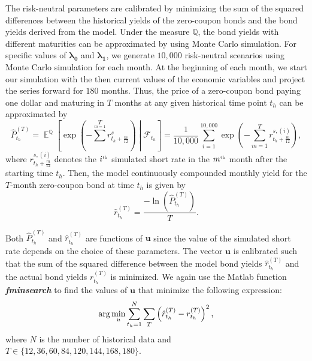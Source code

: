 \documentclass{sfuthesis}
\DeclareMathOperator{\E}{\mathbb{E}}
\numberwithin{equation}{chapter}
\begin{document}
		\justify
		The risk-neutral parameters are calibrated by minimizing the sum of the squared differences between the historical yields of the zero-coupon bonds and the bond yields derived from the model. Under the measure $\mathbb{Q}$, the bond yields with different maturities can be approximated by using Monte Carlo simulation. For specific values of $\boldsymbol{\lambda_0}$ and $\boldsymbol{\lambda_1}$, we generate $10,000$ risk-neutral scenarios using Monte Carlo simulation for each month. At the beginning of each month, we start our simulation with the then current values of the economic variables and project the series forward for $180$ months. Thus, the price of a zero-coupon bond paying one dollar and maturing in $T$ months at any given historical time point $t_h$ can be approximated by
		\begin{equation}
		\label{eq:EMR_10}
		\hat{P}^{(T)}_{t_h} = \E^\mathbb{Q} \left[\exp\left({-\sum^{T}\limits_{m = 1}r_{t_h+ \frac{m}{12}}^s }\right)\middle|\mathcal{F}_{t_{h}}\right] = \frac{1}{10,000}\sum_{i=1}^{10,000}\exp\left({-\sum\limits_{m=1}^{T}r_{t_{h}+\frac{m}{12}}^{s,(i)}}\right),
		\end{equation}
		where $r_{t_h+\frac{m}{12}}^{s, (i)}$ denotes the $i^{\text{\tiny{th}}}$ simulated short rate in the $m^{\text{\tiny{th}}}$ month after the starting time $t_h$. Then, the model continuously compounded monthly yield for the $T$-month zero-coupon bond at time $t_h$ is given by
		\begin{equation}
		\label{eq:EMR_11}
		\hat{r}^{(T)}_{t_h} = \frac{-\ln\left(\hat{P}^{(T)}_{t_h}\right)}{T}.
		\end{equation}


		\justify
		Both $\hat{P}^{(T)}_{t_h}$ and $\hat{r}^{(T)}_{t_h}$ are functions of $\boldsymbol{u}$ since the value of the simulated short rate depends on the choice of these parameters. The vector $\boldsymbol{u}$ is calibrated such that the sum of the squared difference between the model bond yields $\hat{r}^{(T)}_{t_h}$ and the actual bond yields $r^{(T)}_{t_h}$ is minimized. We again use the Matlab function \textbf{\textit{fminsearch}} to find the values of $\boldsymbol{u}$ that minimize the following expression:
		\begin{equation}
		\label{eq:EMR_12}
		\textnormal{arg}\min_{u}\sum_{t_{h}=1}^{N}\sum_{T}\left(\hat{r}^{(T)}_{t_h} -{r}^{(T)}_{t_h} \right)^2,
		\end{equation}
		where $N$ is the number of historical data and $T \in \{12, 36, 60, 84, 120, 144, 168, 180\}$.
\end{document}

